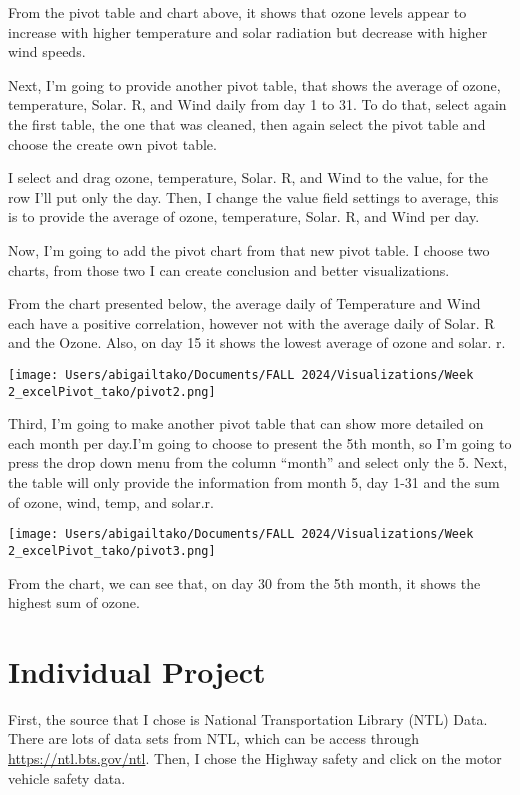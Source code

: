 \documentclass[
  letterpaper,
  DIV=11,
  numbers=noendperiod]{scrreprt}
\begin{document}
From the pivot table and chart above, it shows that ozone levels appear
to increase with higher temperature and solar radiation but decrease
with higher wind speeds.

Next, I'm going to provide another pivot table, that shows the average
of ozone, temperature, Solar. R, and Wind daily from day 1 to 31. To do
that, select again the first table, the one that was cleaned, then again
select the pivot table and choose the create own pivot table.

I select and drag ozone, temperature, Solar. R, and Wind to the value,
for the row I'll put only the day. Then, I change the value field
settings to average, this is to provide the average of ozone,
temperature, Solar. R, and Wind per day.

Now, I'm going to add the pivot chart from that new pivot table. I
choose two charts, from those two I can create conclusion and better
visualizations.

From the chart presented below, the average daily of Temperature and
Wind each have a positive correlation, however not with the average
daily of Solar. R and the Ozone. Also, on day 15 it shows the lowest
average of ozone and solar. r.

\texttt{[image: Users/abigailtako/Documents/FALL 2024/Visualizations/Week 2\_excelPivot\_tako/pivot2.png]}

Third, I'm going to make another pivot table that can show more detailed
on each month per day.I'm going to choose to present the 5th month, so
I'm going to press the drop down menu from the column ``month'' and
select only the 5. Next, the table will only provide the information
from month 5, day 1-31 and the sum of ozone, wind, temp, and solar.r.

\texttt{[image: Users/abigailtako/Documents/FALL 2024/Visualizations/Week 2\_excelPivot\_tako/pivot3.png]}

From the chart, we can see that, on day 30 from the 5th month, it shows
the highest sum of ozone.

\section{Individual Project}\label{individual-project}

First, the source that I chose is National Transportation Library (NTL)
Data. There are lots of data sets from NTL, which can be access through
\url{https://ntl.bts.gov/ntl}. Then, I chose the Highway safety and
click on the motor vehicle safety data.
\end{document}
